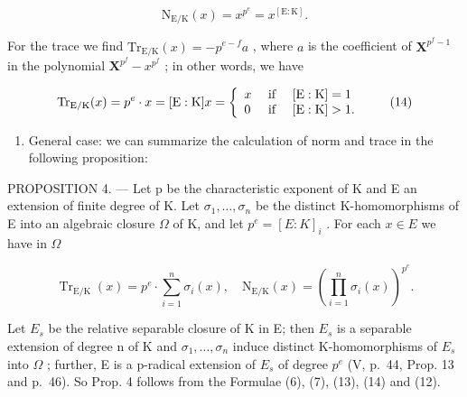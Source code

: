 \[
\mathrm{N} _ {\mathrm{E} / \mathrm{K}} (x) = x ^ {p ^ {e}} = x ^ {[ \mathrm{E}: \mathrm{K} ]}.\tag{13}
\]

For the trace we find \(\mathrm{Tr}_{\mathrm{E} / \mathrm{K}}(x) = -p^{e - f}a\) , where \(a\) is the coefficient of \(\mathbf{X}^{p^f - 1}\) in the polynomial \(\mathbf{X}^{p^f} - x^{p^f}\) ; in other words, we have

\[
\operatorname{Tr} _ {\mathrm{E} / \mathrm{K}} (x) = p ^ {e} \cdot x = [ \mathrm{E}: \mathrm{K} ] x = \left\{ \begin{array}{l l} x & \text { if } \quad [ \mathrm{E}: \mathrm{K} ] = 1 \\ 0 & \text { if } \quad [ \mathrm{E}: \mathrm{K} ] > 1. \end{array} \right.\tag{14}
\]

\begin{enumerate}
\def\labelenumi{\alph{enumi})}
\setcounter{enumi}{2}
\tightlist
\item
  General case: we can summarize the calculation of norm and trace in the following proposition:
\end{enumerate}

PROPOSITION 4. --- Let p be the characteristic exponent of K and E an extension of finite degree of K. Let \(\sigma_{1}, \ldots, \sigma_{n}\) be the distinct K-homomorphisms of E into an algebraic closure \(\Omega\) of K, and let \(p^{e} = [E : K]_{i}\) . For each \(x \in E\) we have in \(\Omega\)

\[
\operatorname{Tr} _ {\mathrm{E} / \mathrm{K}} (x) = p ^ {e} \cdot \sum_ {i = 1} ^ {n} \sigma_ {i} (x), \quad \mathrm{N} _ {\mathrm{E} / \mathrm{K}} (x) = \left(\prod_ {i = 1} ^ {n} \sigma_ {i} (x)\right) ^ {p ^ {e}}.\tag{15}
\]

Let \(E_s\) be the relative separable closure of K in E; then \(E_s\) is a separable extension of degree n of K and \(\sigma_1, \ldots, \sigma_n\) induce distinct K-homomorphisms of \(E_s\) into \(\Omega\) ; further, E is a p-radical extension of \(E_s\) of degree \(p^e\) (V, p.~44, Prop. 13 and p.~46). So Prop. 4 follows from the Formulae (6), (7), (13), (14) and (12).

